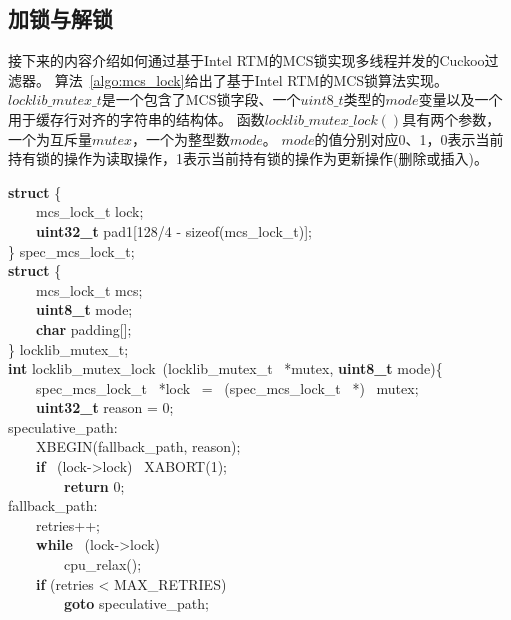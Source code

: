\subsection{加锁与解锁}
接下来的内容介绍如何通过基于Intel RTM的MCS锁实现多线程并发的Cuckoo过滤器。
算法~\ref{algo:mcs_lock}给出了基于Intel RTM的MCS锁算法实现。
$locklib\_mutex\_t$是一个包含了MCS锁字段、一个$uint8\_t$类型的$mode$变量以及一个用于缓存行对齐的字符串的结构体。
函数$locklib\_mutex\_lock()$具有两个参数，一个为互斥量$mutex$，一个为整型数$mode$。
$mode$的值分别对应0、1，0表示当前持有锁的操作为读取操作，1表示当前持有锁的操作为更新操作(删除或插入)。
\begin{algorithm}[htbp]
\textbf{struct} \{\\
        ~~~~mcs\_lock\_t    lock;\\
        ~~~~\textbf{uint32\_t}    pad1[128/4 - sizeof(mcs\_lock\_t)];\\
\} spec\_mcs\_lock\_t;\\

\textbf{struct} \{\\
        ~~~~mcs\_lock\_t        mcs;\\
        ~~~~\textbf{uint8\_t} mode;\\
       ~~~~\textbf{char} padding[];\\
\} locklib\_mutex\_t;\\

\textbf{int} locklib\_mutex\_lock~(locklib\_mutex\_t ~*mutex, \textbf{uint8\_t} mode)\{\\
        ~~~~spec\_mcs\_lock\_t~ *lock ~= ~(spec\_mcs\_lock\_t ~*) ~mutex;\\
        ~~~~\textbf{uint32\_t} reason = 0;\\

speculative\_path:\\
        ~~~~XBEGIN(fallback\_path, reason);\\
        ~~~~\textbf{if}~ (lock->lock) ~XABORT(1); \\
        ~~~~~~~~\textbf{return} 0;\\

fallback\_path:\\
        ~~~~retries++;\\
        ~~~~\textbf{while}~ (lock->lock)\\
                ~~~~~~~~cpu\_relax();\\
        ~~~~\textbf{if} (retries < MAX\_RETRIES)\\
                ~~~~~~~~\textbf{goto} speculative\_path;\\


\end{algorithm}
